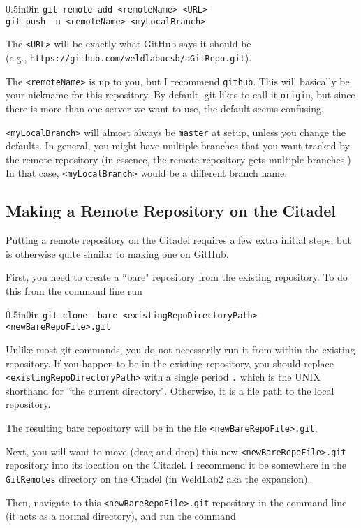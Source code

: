 \documentclass[11pt]{article}
\newcommand{\code}[1]{\begin{adjustwidth}{0.5in}{0in}
    \texttt{#1}
    \end{adjustwidth}}
\begin{document}
\code{git remote add <remoteName> <URL>\\
git push -u <remoteName> <myLocalBranch>}

The \texttt{<URL>} will be exactly what GitHub says it should be\\ (e.g., \texttt{https://github.com/weldlabucsb/aGitRepo.git}).  

The \texttt{<remoteName>} is up to you, but I recommend \texttt{github}.  This will basically be your nickname for this repository.  By default, git likes to call it \texttt{origin}, but since there is more than one server we want to use, the default seems confusing.

\texttt{<myLocalBranch>} will almost always be \texttt{master} at setup, unless you change the defaults. In general, you might have multiple branches that you want tracked by the remote repository (in essence, the remote repository gets multiple branches.)  In that case, \texttt{<myLocalBranch>} would be a different branch name.

\subsection{Making a Remote Repository on the Citadel}

Putting a remote repository on the Citadel requires a few extra initial steps, but is otherwise quite similar to making one on GitHub.  

First, you need to create a ``bare" repository from the existing repository.  To do this from the command line run

\code{git clone --bare <existingRepoDirectoryPath> <newBareRepoFile>.git}

Unlike most git commands, you do not necessarily run it from within the existing repository.  If you happen to be in the existing repository, you should replace \texttt{<existingRepoDirectoryPath>} with a single period \texttt{.} which is the UNIX shorthand for ``the current directory".  Otherwise, it is a file path to the local repository.

The resulting bare repository will be in the file \texttt{<newBareRepoFile>.git}.

Next, you will want to move (drag and drop) this new \texttt{<newBareRepoFile>.git} repository into its location on the Citadel.  I recommend it be somewhere in the \texttt{GitRemotes} directory on the Citadel (in WeldLab2 aka the expansion).

Then, navigate to this \texttt{<newBareRepoFile>.git} repository in the command line (it acts as a normal directory), and run the command
\end{document}
